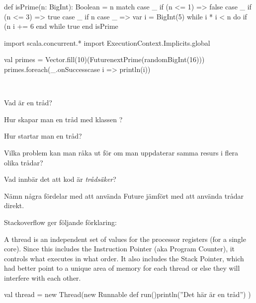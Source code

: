 \SOLUTION


\TaskSolved \what

\begin{Code}
def isPrime(n: BigInt): Boolean = n match 
  case _ if (n <= 1) => false
  case _ if (n <= 3) => true
  case _ if n %
  case _ =>
    var i = BigInt(5)
    while i * i < n do
      if (n %
      i += 6
    end while
    true
end isPrime

import scala.concurrent.*
import ExecutionContext.Implicits.global

val primes = Vector.fill(10)(Future{nextPrime(randomBigInt(16))})
primes.foreach(_.onSuccess{case i => println(i)})
\end{Code}


\QUESTEND







\QUESTBEGIN

\Task  \what~\Pen

\Subtask Vad är en tråd?

\Subtask Hur skapar man en tråd med klassen ?

\Subtask Hur startar man en tråd?

\Subtask Vilka problem kan man råka ut för om man uppdaterar samma resurs i flera olika trådar?

\Subtask Vad innbär det att kod är \emph{trådsäker}?

\Subtask Nämn några fördelar med att använda Future jämfört med att använda trådar direkt.


\SOLUTION


\TaskSolved \what

\SubtaskSolved  Stackoverflow ger följande förklaring:

A thread is an independent set of values for the processor registers (for a single core). Since this includes the Instruction Pointer (aka Program Counter), it controls what executes in what order. It also includes the Stack Pointer, which had better point to a unique area of memory for each thread or else they will interfere with each other.

\SubtaskSolved

\begin{Code}
val thread = new Thread(new Runnable{
	def run(){println(''Det här är en tråd'')}
})
\end{Code}

